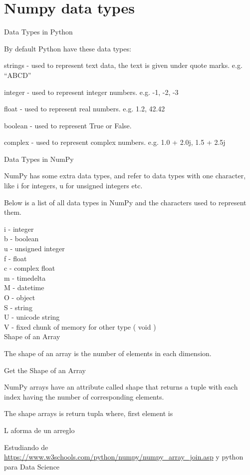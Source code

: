 \section{Numpy data types}

Data Types in Python

By default Python have these data types:

strings - used to represent text data, the text is given under quote marks. e.g. ``ABCD''


integer - used to represent integer numbers. e.g. -1, -2, -3

float - used to represent real numbers. e.g. 1.2, 42.42

boolean - used to represent True or False.

complex - used to represent complex numbers. e.g. 1.0 + 2.0j, 1.5 + 2.5j

Data Types in NumPy

NumPy has some extra data types, and refer to data types with one character, like i for integers, u for unsigned integers etc.

Below is a list of all data types in NumPy and the characters used to represent them.

i - integer\\
b - boolean\\
u - unsigned integer\\
f - float\\
c - complex float\\
m - timedelta\\
M - datetime\\
O - object\\
S - string\\
U - unicode string\\
V - fixed chunk of memory for other type ( void )\\


Shape of an Array

The shape of an array is the number of elements in each dimension.

Get the Shape of an Array

NumPy arrays have an attribute called shape that returns a tuple with each index having the number of corresponding elements.

The shape arrays is return tupla where, first element is 

L aforma de un arreglo 


Estudiando de 
\url{https://www.w3schools.com/python/numpy/numpy_array_join.asp} y python para Data Science

